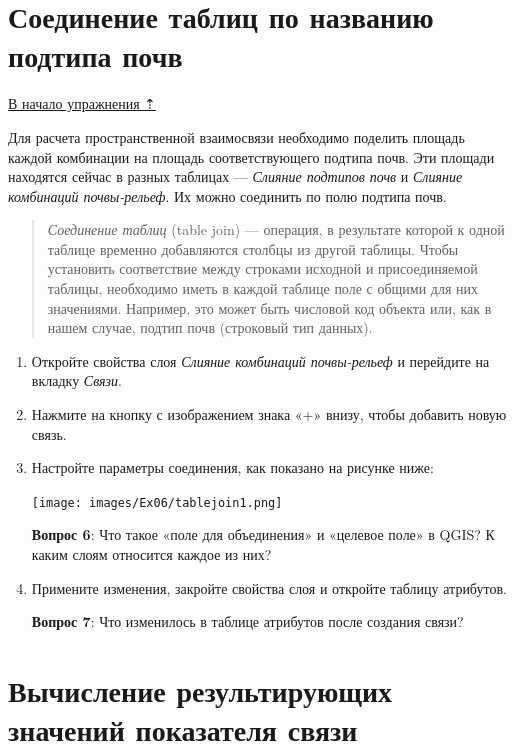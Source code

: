 \documentclass[
  12pt,
]{book}
\begin{document}
\hypertarget{overlay-join}{%
\section{Соединение таблиц по названию подтипа почв}\label{overlay-join}}

\protect\hyperlink{overlay}{В начало упражнения ⇡}

Для расчета пространственной взаимосвязи необходимо поделить площадь каждой комбинации на площадь соответствующего подтипа почв. Эти площади находятся сейчас в разных таблицах --- \emph{Слияние подтипов почв} и \emph{Слияние комбинаций почвы-рельеф}. Их можно соединить по полю подтипа почв.

\begin{quote}
\emph{Соединение таблиц} (table join) --- операция, в результате которой к одной таблице временно добавляются столбцы из другой таблицы. Чтобы установить соответствие между строками исходной и присоединяемой таблицы, необходимо иметь в каждой таблице поле с общими для них значениями. Например, это может быть числовой код объекта или, как в нашем случае, подтип почв (строковый тип данных).
\end{quote}

\begin{enumerate}
\def\labelenumi{\arabic{enumi}.}
\item
  Откройте свойства слоя \emph{Слияние комбинаций почвы-рельеф} и перейдите на вкладку \emph{Связи}.
\item
  Нажмите на кнопку с изображением знака «+» внизу, чтобы добавить новую связь.
\item
  Настройте параметры соединения, как показано на рисунке ниже:

  \texttt{[image: images/Ex06/tablejoin1.png]}

  \textbf{Вопрос 6}: Что такое «поле для объединения» и «целевое поле» в QGIS? К каким слоям относится каждое из них?
\item
  Примените изменения, закройте свойства слоя и откройте таблицу атрибутов.

  \textbf{Вопрос 7}: Что изменилось в таблице атрибутов после создания связи?
\end{enumerate}

\hypertarget{overlay-resulting}{%
\section{Вычисление результирующих значений показателя связи}\label{overlay-resulting}}
\end{document}
